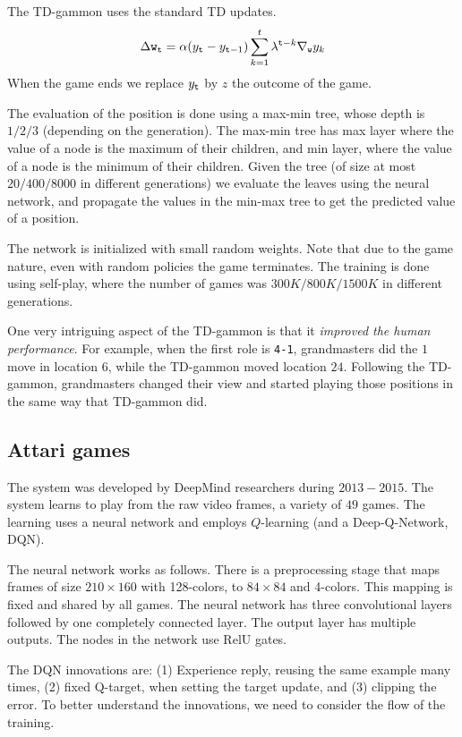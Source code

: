 The TD-gammon uses the standard TD updates.
\[
\Delta {\tt w}_{\tt t} =
\alpha(y_{\tt t}-y_{{\tt t}-1})\sum_{k=1}^{t}\lambda^{{\tt t}-k}\nabla_{\tt w}
y_k
\]
When the game ends we replace $y_{\tt t}$ by $z$ the outcome of the
game.



The evaluation of the position is done using a max-min tree, whose
depth is $1/2/3$ (depending on the generation). The max-min tree has max layer where the value of
a node is the maximum of their children, and min layer, where the
value of a node is the minimum of their children. Given the tree (of
size at most $20/400/8000$ in different generations) we evaluate the
leaves using the neural network, and propagate the values in the
min-max tree to get the predicted value of a position.

The network is initialized with small random weights. Note that due
to the game nature, even with random policies the game terminates.
The training is done using self-play, where the number of games was
$300K/800K/1500K$ in different generations.

One very intriguing aspect  of the TD-gammon is that it {\em
improved the human performance}. For example, when the first role is
{\tt 4-1}, grandmasters did the $1$ move in location $6$, while the
TD-gammon moved location $24$. Following the TD-gammon, grandmasters
changed their view and started playing those positions in the same
way that TD-gammon did.

\subsection{Attari games}

The system was developed by DeepMind researchers during $2013-2015$.
The system learns to play from the raw video frames, a variety of
$49$ games. The learning uses a neural network and employs
$Q$-learning (and a Deep-Q-Network, DQN).

The neural network works as follows. There is a preprocessing stage
that maps frames of size $210\times 160$ with 128-colors, to
$84\times 84$ and 4-colors. This mapping is fixed and shared by all
games. The neural network has three convolutional layers followed by
one completely connected layer. The output layer has multiple
outputs. The nodes in the network use RelU gates.

The DQN innovations are: (1) Experience reply, reusing the same
example many times, (2) fixed Q-target, when setting the target
update, and (3) clipping the error. To better understand the
innovations, we need to consider the flow of the training.

